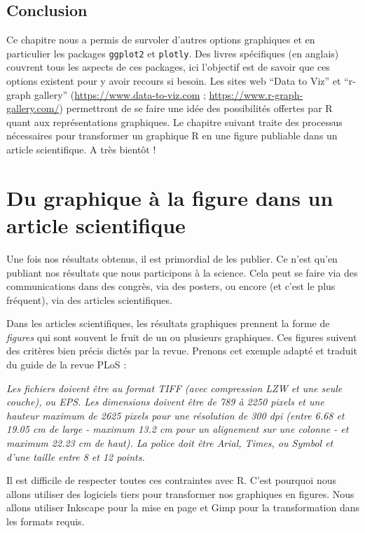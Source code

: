 \documentclass[]{book}
\begin{document}
\hypertarget{conclusion-10}{%
\section{Conclusion}\label{conclusion-10}}

Ce chapitre nous a permis de survoler d'autres options graphiques et en particulier les packages \texttt{ggplot2} et \texttt{plotly}. Des livres spécifiques (en anglais) couvrent tous les aspects de ces packages, ici l'objectif est de savoir que ces options existent pour y avoir recours si besoin. Les sites web ``Data to Viz'' et ``r-graph gallery'' (\url{https://www.data-to-viz.com} ; \url{https://www.r-graph-gallery.com/}) permettront de se faire une idée des possibilités offertes par R quant aux représentations graphiques. Le chapitre suivant traite des processus nécessaires pour transformer un graphique R en une figure publiable dans un article scientifique. A très bientôt !

\hypertarget{graph4}{%
\chapter{Du graphique à la figure dans un article scientifique}\label{graph4}}

Une fois nos résultats obtenus, il est primordial de les publier. Ce n'est qu'en publiant nos résultats que nous participons à la science. Cela peut se faire via des communications dans des congrès, via des posters, ou encore (et c'est le plus fréquent), via des articles scientifiques.

Dans les articles scientifiques, les résultats graphiques prennent la forme de \emph{figures} qui sont souvent le fruit de un ou plusieurs graphiques. Ces figures suivent des critères bien précis dictés par la revue. Prenons cet exemple adapté et traduit du guide de la revue PLoS :

\emph{Les fichiers doivent être au format TIFF (avec compression LZW et une seule couche), ou EPS. Les dimensions doivent être de 789 à 2250 pixels et une hauteur maximum de 2625 pixels pour une résolution de 300 dpi (entre 6.68 et 19.05 cm de large - maximum 13.2 cm pour un alignement sur une colonne - et maximum 22.23 cm de haut). La police doit être Arial, Times, ou Symbol et d'une taille entre 8 et 12 points.}

Il est difficile de respecter toutes ces contraintes avec R. C'est pourquoi nous allons utiliser des logiciels tiers pour transformer nos graphiques en figures. Nous allons utiliser Inkscape pour la mise en page et Gimp pour la transformation dans les formats requis.
\end{document}
